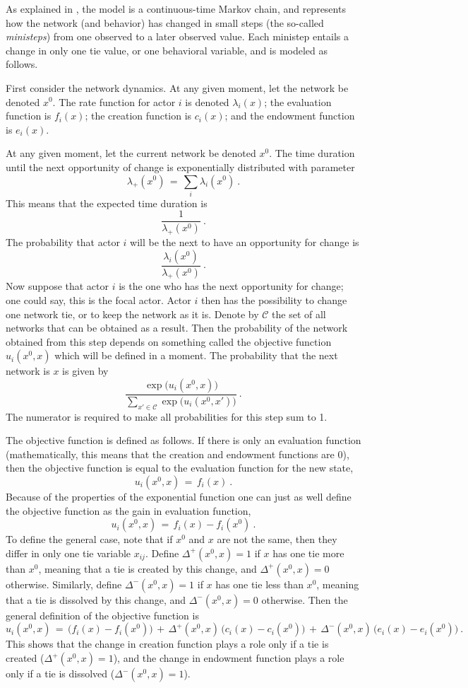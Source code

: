 \documentclass[a4paper,fleqn,11pt]{article}
\newcommand{\+}{\, + \,}
\begin{document}
{As explained in \citet*{SnijdersEA10b}, the model is a continuous-time
Markov chain, and represents how the network (and behavior) has changed
in small steps (the so-called \emph{ministeps}) from one observed
to a later observed value. Each ministep entails a change in only
one tie value, or one behavioral variable, and is modeled as follows.

First consider the network dynamics.
At any given moment, let the network be denoted $x^0$.
The rate function for actor $i$ is denoted $\lambda_i(x)$;
the evaluation function is $f_i(x)$; the creation function is $c_i(x)$;
and the endowment function is $e_i(x)$.

At any given moment, let the current network be denoted $x^0$.
The time duration until the next opportunity of change
is exponentially distributed with parameter
\[
  \lambda_+(x^0) \,=\, \sum_i \lambda_i(x^0) \ .
\]
This means that the expected time duration is
\[
   \frac{1}{\lambda_+(x^0)} \ .
\]
The probability that actor $i$ will be the next to
have an opportunity for change is
\[
  \frac{\lambda_i(x^0)}{\lambda_+(x^0)} \ .
\]
Now suppose that actor $i$ is the one who has the next opportunity
for change; one could say, this is the focal actor.
Actor $i$ then has the possibility to change one network tie,
or to keep the network as it is.
Denote by $\mathcal C$ the set of all networks that can be obtained
as a result.
Then the probability of the network obtained from this step depends on
something called the objective function $u_i(x^0, x)$ which will be defined
in a moment.
The probability that the next network is $x$ is given by
\[
     \frac{\exp(u_i(x^0, x)\big)}
          {\sum_{x' \in \mathcal C} \exp\big(u_i(x^0, x')\big)} \ .
\]
The numerator is required to make all probabilities for this step sum to 1.

The objective function is defined as follows.
If there is only an evaluation function (mathematically, this means that
the creation and endowment functions are 0), then
the objective function is equal to the evaluation function for the new state,
\[
   u_i(x^0, x) \,=\, f_i(x) \ .
\]
Because of the properties of the exponential function one can just as
well define the objective function as the gain in evaluation function,
\[
   u_i(x^0, x) \,=\, f_i(x) - f_i(x^0) \ .
\]
To define the general case, note that if $x^0$ and $x$ are not the same,
then they differ in only one tie variable $x_{ij}$.
Define  $\Delta^+(x^0, x) = 1$ if $x$ has one tie more than $x^0$,
meaning that a tie is created by this change, and $\Delta^+(x^0, x) = 0$
otherwise.
Similarly, define  $\Delta^-(x^0, x) = 1$ if $x$ has one tie less than $x^0$,
meaning that a tie is dissolved by this change, and $\Delta^-(x^0, x) = 0$
otherwise.
Then the general definition of the objective function is
\[
   u_i(x^0, x) \,=\, \big(f_i(x) - f_i(x^0)\big)
                   \,+\,  \Delta^+(x^0, x)\,\big(c_i(x) - c_i(x^0)\big)
                   \,+\,  \Delta^-(x^0, x)\,\big(e_i(x) - e_i(x^0)\big)    \ .
\]
This shows that the change in creation function plays a role
only if a tie is created ($\Delta^+(x^0,x) = 1$), and the change in
endowment function plays a role
only if a tie is dissolved ($\Delta^-(x^0,x) = 1$).
\medskip

}
\end{document}
